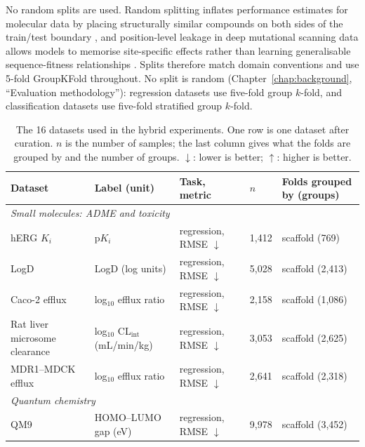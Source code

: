 No random splits are used. Random splitting inflates performance estimates for molecular data by placing structurally similar compounds on both sides of the train/test boundary \citep{Yang2019, Wallach2018}, and position-level leakage in deep mutational scanning data allows models to memorise site-specific effects rather than learning generalisable sequence-fitness relationships \citep{Notin2023, Vieira2026}. Splits therefore match domain conventions and use 5-fold GroupKFold throughout.
No split is random (Chapter~\ref{chap:background}, ``Evaluation methodology''): regression datasets use five-fold group $k$-fold, and classification datasets use five-fold stratified group $k$-fold.

\begin{table}[htbp]
\centering
\small
\setlength{\tabcolsep}{3pt}
\caption{The 16 datasets used in the hybrid experiments. One row is one dataset after curation. $n$ is the number of samples; the last column gives what the folds are grouped by and the number of groups. $\downarrow$: lower is better; $\uparrow$: higher is better.}
\label{tab:datasets}
\begin{tabular}{p{3.0cm}p{3.3cm}p{2.3cm}p{1.1cm}p{3.5cm}}
\toprule
Dataset & Label (unit) & Task, metric & $n$ & Folds grouped by (groups) \\
\midrule
\multicolumn{5}{l}{\textit{Small molecules: ADME and toxicity}} \\
hERG $K_i$ \citep{Zdrazil2023} & p$K_i$ & regression, RMSE $\downarrow$ & 1,412 & scaffold (769) \\
LogD \citep{openadmet} & LogD (log units) & regression, RMSE $\downarrow$ & 5,028 & scaffold (2,413) \\
Caco-2 efflux \citep{openadmet} & log$_{10}$ efflux ratio & regression, RMSE $\downarrow$ & 2,158 & scaffold (1,086) \\
Rat liver microsome clearance \citep{fang2023, polaris} & log$_{10}$ CL$_\text{int}$ (mL/min/kg) & regression, RMSE $\downarrow$ & 3,053 & scaffold (2,625) \\
MDR1--MDCK efflux \citep{fang2023, polaris} & log$_{10}$ efflux ratio & regression, RMSE $\downarrow$ & 2,641 & scaffold (2,318) \\
\midrule
\multicolumn{5}{l}{\textit{Quantum chemistry}} \\
QM9 \citep{Ramakrishnan2014, qm9_dataset} & HOMO--LUMO gap (eV) & regression, RMSE $\downarrow$ & 9,978 & scaffold (3,452) \\

\end{tabular}
\end{table}
